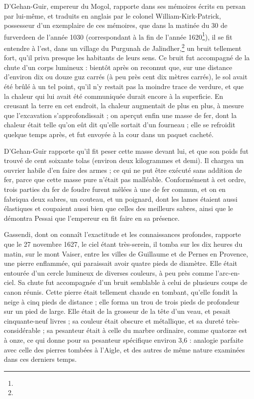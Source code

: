 \documentclass[a4paper, 12pt, oneside, french]{article}
\begin{document}
D'Gehan-Guir, empereur du Mogol, rapporte dans ses mémoires écrits en persan par lui-même, et traduits en anglais par le colonel William-Kirk-Patrick, possesseur d'un exemplaire de ces mémoires, que dans la matinée du 30 de furverdeen de l'année 1030 (correspondant à la fin de l'année 1620\footnote{}), il se fit entendre à l'est, dans un village du Purgunah de Jalindher,\footnote{} un bruit tellement fort, qu'il priva presque les habitants de leurs sens. Ce bruit fut accompagné de la chute d'un corps lumineux : bientôt après on reconnut que, sur une distance d'environ dix ou douze guz carrés (à peu près cent dix mètres carrés), le sol avait été brûlé à un tel point, qu'il n'y restait pas la moindre trace de verdure, et que la chaleur qui lui avait été communiquée durait encore à la superficie. En creusant la terre en cet endroit, la chaleur augmentait de plus en plus, à mesure que l'excavation s'approfondissait ; on aperçut enfin une masse de fer, dont la chaleur était telle qu'on eût dit qu'elle sortait d'un fourneau ; elle se refroidit quelque temps après, et fut envoyée à la cour dans un paquet cacheté.

D'Gehan-Guir rapporte qu'il fit peser cette masse devant lui, et que son poids fut trouvé de cent soixante tolas (environ deux kilogrammes et demi). Il chargea un ouvrier habile d'en faire des armes ; ce qui ne put être exécuté sans addition de fer, parce que cette masse pure n'était pas malléable. Conformément à cet ordre, trois parties du fer de foudre furent mêlées à une de fer commun, et on en fabriqua deux sabres, un couteau, et un poignard, dont les lames étaient aussi élastiques et coupaient aussi bien que celles des meilleurs sabres, ainsi que le démontra Pessai que l'empereur en fit faire en sa présence.

Gassendi, dont on connaît l'exactitude et les connaissances profondes, rapporte que le 27 novembre 1627, le ciel étant très-serein, il tomba sur les dix heures du matin, sur le mont Vaiser, entre les villes de Guillaume et de Pernes en Provence, une pierre enflammée, qui paraissait avoir quatre pieds de diamètre. Elle était entourée d'un cercle lumineux de diverses couleurs, à peu près comme l'arc-en-ciel. Sa chute fut accompagnée d'un bruit semblable à celui de plusieurs coups de canon réunis. Cette pierre était tellement chaude en tombant, qu'elle fondit la neige à cinq pieds de distance ; elle forma un trou de trois pieds de profondeur sur un pied de large. Elle était de la grosseur de la tête d'un veau, et pesait cinquante-neuf livres ; sa couleur était obscure et métallique, et sa dureté très-considérable ; sa pesanteur était à celle du marbre ordinaire, comme quatorze est à onze, ce qui donne pour sa pesanteur spécifique environ 3,6 : analogie parfaite avec celle des pierres tombées à l'Aigle, et des autres de même nature examinées dans ces derniers temps.
\end{document}
